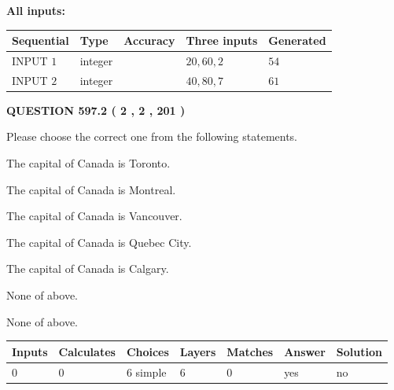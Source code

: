 \documentclass[12pt]{article}
\begin{document}
   
   
   
\noindent\vspace{0.1in}\hspace{-0.08in} {\textbf{\Large{All inputs: }}}
   
   
  
  
\noindent\begin{tabular}{|l|l|l|l|l|}
\hline
 Sequential & Type & Accuracy & Three inputs & Generated \\ 
\hline
 
 
  INPUT $  1 $ & integer &  & $
 20
 , 
 60
 , 
 2
 $ & $ 54 $ 
 \\  \hline  
 
 
  INPUT $  2 $ & integer &  & $
 40
 , 
 80
 , 
 7
 $ & $ 61 $ 
 \\  \hline  
 \end{tabular}
   
   
  
\vspace{0.2in}
  
{\textbf{\Large{QUESTION
597.2 
 ( 2 , 2 , 201 )
}}}
  
  
Please choose the correct one from the following statements.
 
 
The capital of Canada is Toronto.
 
 
The capital of Canada is Montreal.
 
 
The capital of Canada is Vancouver.
 
 
The capital of Canada is Quebec City.
 
 
The capital of Canada is Calgary.
 
 
 None of above.
 
 
\noindent{}
 
 
 None of above.
 
 
\noindent{}
 
 
   
   
   
   
\noindent\begin{tabular}{|l|l|l|l|l|l|l|}
 \hline
Inputs & Calculates & Choices & Layers & Matches & Answer & Solution \\ \hline
 0  & 
 0  & 
 6
  simple  
  & 
 6  & 
 0  & 
  yes & 
  no 
  \\ \hline
 \end{tabular}
   
\end{document}
